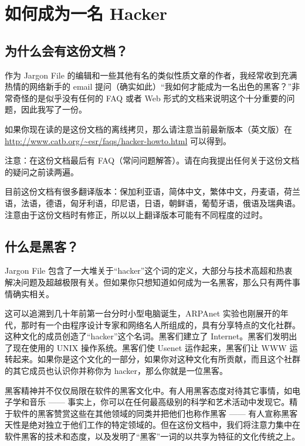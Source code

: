 \section{如何成为一名 Hacker}

\subsection{为什么会有这份文档？}
作为 Jargon File 的编辑和一些其他有名的类似性质文章的作者，我经常收到充满热情的网络新手的 email 提问（确实如此）“我如何才能成为一名出色的黑客？”非常奇怪的是似乎没有任何的 FAQ 或者 Web 形式的文档来说明这个十分重要的问题，因此我写了一份。


如果你现在读的是这份文档的离线拷贝，那么请注意当前最新版本（英文版）在 \url{http://www.catb.org/~esr/faqs/hacker-howto.html} 可以得到。

注意：在这份文档最后有 FAQ（常问问题解答）。请在向我提出任何关于这份文档的疑问之前读两遍。

目前这份文档有很多翻译版本：保加利亚语，简体中文，繁体中文，丹麦语，荷兰语，法语，德语，匈牙利语，印尼语，日语，朝鲜语，葡萄牙语，俄语及瑞典语。注意由于这份文档时有修正，所以以上翻译版本可能有不同程度的过时。


\subsection{什么是黑客？}
Jargon File 包含了一大堆关于“hacker”这个词的定义，大部分与技术高超和热衷解决问题及超越极限有关。但如果你只想知道如何成为一名黑客，那么只有两件事情确实相关。

这可以追溯到几十年前第一台分时小型电脑诞生，ARPAnet 实验也刚展开的年代，那时有一个由程序设计专家和网络名人所组成的，具有分享特点的文化社群。这种文化的成员创造了“hacker”这个名词。黑客们建立了 Internet。黑客们发明出了现在使用的 UNIX 操作系统。黑客们使 Usenet 运作起来，黑客们让 WWW 运转起来。如果你是这个文化的一部分，如果你对这种文化有所贡献，而且这个社群的其它成员也认识你并称你为 hacker，那么你就是一位黑客。

黑客精神并不仅仅局限在软件的黑客文化中。有人用黑客态度对待其它事情，如电子学和音乐 —— 事实上，你可以在任何最高级别的科学和艺术活动中发现它。精于软件的黑客赞赏这些在其他领域的同类并把他们也称作黑客 —— 有人宣称黑客天性是绝对独立于他们工作的特定领域的。但在这份文档中，我们将注意力集中在软件黑客的技术和态度，以及发明了“黑客”一词的以共享为特征的文化传统之上。

